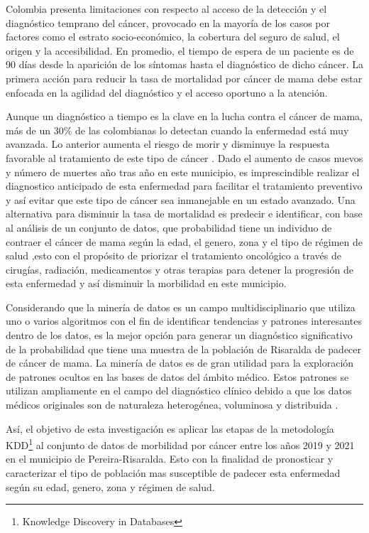 Colombia presenta limitaciones con respecto al acceso de la detección y el diagnóstico temprano del cáncer, provocado en la mayoría de los casos por factores como el estrato socio-económico, la cobertura del seguro de salud, el origen y la accesibilidad. En promedio, el tiempo de espera de un paciente es de 90 días desde la aparición de los síntomas hasta el diagnóstico de dicho cáncer. La primera acción para reducir la tasa de mortalidad por cáncer de mama debe estar enfocada en la agilidad del diagnóstico y el acceso oportuno a la atención\cite{Duarte2021}. 

Aunque un diagnóstico a tiempo es la clave en la lucha contra el cáncer de mama, más de un 30\% de las colombianas lo detectan cuando la enfermedad está muy avanzada. Lo anterior aumenta el riesgo de morir y disminuye la respuesta favorable al tratamiento de este tipo de cáncer \cite{Risaralda2021}. Dado el aumento de casos nuevos y número de muertes año tras año en este municipio, es imprescindible realizar el diagnostico anticipado de esta enfermedad para facilitar el tratamiento preventivo y así evitar que este tipo de cáncer sea inmanejable en un estado avanzado. Una alternativa para disminuir la tasa de mortalidad es predecir e identificar, con base al análisis de un conjunto de datos, que probabilidad tiene un individuo de contraer el cáncer de mama según la edad, el genero, zona y el tipo de régimen de salud ,esto con el propósito de priorizar el tratamiento oncológico a través de cirugías, radiación, medicamentos y otras terapias para detener la progresión de esta enfermedad y así disminuir la morbilidad en este municipio.

Considerando que la minería de datos es un campo multidisciplinario que utiliza uno o varios algoritmos con el fin de identificar tendencias y patrones interesantes dentro de los datos, es la mejor opción para generar un diagnóstico significativo de la probabilidad que tiene una muestra de la población de Risaralda de padecer de cáncer de mama. La  minería de datos es de gran utilidad para la exploración de patrones ocultos en las bases de datos del ámbito médico. Estos patrones se utilizan ampliamente en el campo del diagnóstico clínico debido a que los datos médicos originales son de naturaleza heterogénea, voluminosa y distribuida \cite{Nalinipriya2021}.

Así, el objetivo de esta investigación es aplicar las etapas de la metodología KDD\footnote{Knowledge Discovery in Databases} al conjunto de datos de morbilidad por cáncer entre los años 2019 y 2021 en el municipio de Pereira-Risaralda. Esto con la finalidad de pronosticar y caracterizar el tipo de población mas susceptible de padecer esta enfermedad según su edad, genero, zona y régimen de salud.


